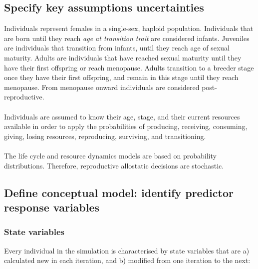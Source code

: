 \documentclass{article}
\begin{document}
\subsection{Specify key assumptions uncertainties}

Individuals represent females in a single-sex, haploid population. Individuals that are born until they reach \emph{age at transition trait} are considered infants. Juveniles are individuals that transition from infants, until they reach age of sexual maturity. Adults are individuals that have reached sexual maturity until they have their first offspring or reach menopause. Adults transition to a breeder stage once they have their first offspring, and remain in this stage until they reach menopause. From menopause onward individuals are considered post-reproductive.
\\\\
Individuals are assumed to know their age, stage, and their current resources available  in order to apply the probabilities of producing, receiving, consuming, giving, losing resources, reproducing, surviving, and transitioning.
\\\\
The life cycle and resource dynamics models are based on probability distributions. Therefore, reproductive allostatic decisions are stochastic.

\subsection{Define conceptual model: identify predictor response variables}

\subsubsection{State variables}

Every individual in the simulation is characterised by state variables that are a) calculated new in each iteration, and b) modified from one iteration to the next:
\end{document}
